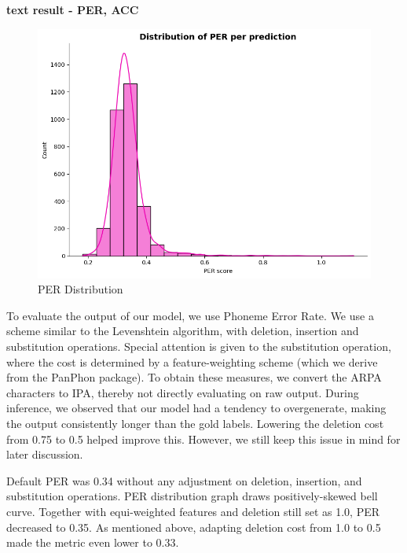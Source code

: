 \documentclass[11pt]{article}
\begin{document}
{\textbf{text result - PER, ACC}
\begin{figure}
    \centering
    \includegraphics[width=0.75\linewidth]{PERdistribution.png}
    \caption{PER Distribution}
    \label{fig:placeholder}
\end{figure}

To evaluate the output of our model, we use Phoneme Error Rate. We use a scheme similar to the Levenshtein algorithm, with deletion, insertion and substitution operations. Special attention is given to the substitution operation, where the cost is determined by a feature-weighting scheme (which we derive from the PanPhon package). To obtain these measures, we convert the ARPA characters to IPA, thereby not directly evaluating on raw output. During inference, we observed that our model had a tendency to overgenerate, making the output consistently longer than the gold labels. Lowering the deletion cost from 0.75 to 0.5 helped improve this. However, we still keep this issue in mind for later discussion. 

Default PER was 0.34 without any adjustment on deletion, insertion, and substitution operations. PER distribution graph draws positively-skewed bell curve. Together with equi-weighted features and deletion still set as 1.0, PER decreased to 0.35. As mentioned above, adapting deletion cost from 1.0 to 0.5 made the metric even lower to 0.33. 


}
\end{document}
